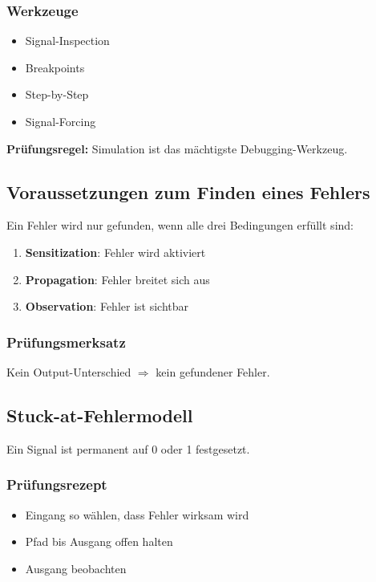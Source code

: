 \documentclass[11pt,a4paper]{article}
\newcommand{\hilite}[1]{\colorbox{yellow!25}{#1}}
\newcommand{\imp}[1]{\textbf{\textcolor{codeemph}{#1}}}
\begin{document}
\subsubsection*{Werkzeuge}
\begin{itemize}
  \item Signal-Inspection
  \item Breakpoints
  \item Step-by-Step
  \item Signal-Forcing
\end{itemize}

\imp{Prüfungsregel:}  
\hilite{Simulation} ist das \hilite{mächtigste} \hilite{Debugging-Werkzeug}.

\subsection{Voraussetzungen zum Finden eines Fehlers}
Ein Fehler wird nur gefunden, wenn alle drei Bedingungen erfüllt sind:

\begin{enumerate}
  \item \textbf{Sensitization}: Fehler wird aktiviert
  \item \textbf{Propagation}: Fehler breitet sich aus
  \item \textbf{Observation}: Fehler ist sichtbar
\end{enumerate}

\subsubsection*{\textcolor{codeemph}{Prüfungsmerksatz}}
Kein Output-Unterschied $\Rightarrow$ kein gefundener Fehler.

\subsection{Stuck-at-Fehlermodell}
Ein Signal ist permanent auf 0 oder 1 festgesetzt.

\subsubsection*{\textcolor{codeemph}{Prüfungsrezept}}
\begin{itemize}
  \item Eingang so wählen, dass Fehler wirksam wird
  \item Pfad bis Ausgang offen halten
  \item Ausgang beobachten
\end{itemize}
\end{document}
